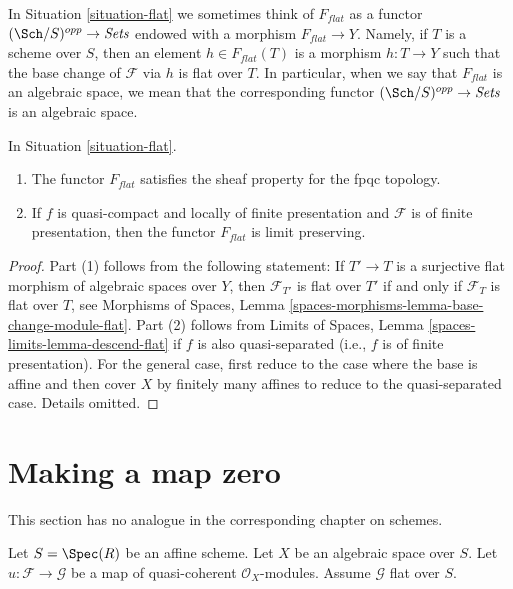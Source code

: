 \noindent
In Situation \ref{situation-flat} we sometimes think of $F_{flat}$ as a functor
$(\Sch/S)^{opp} \to \textit{Sets}$ endowed with a morphism
$F_{flat} \to Y$. Namely, if $T$ is a scheme over $S$, then
an element $h \in F_{flat}(T)$ is a morphism $h : T \to Y$
such that the base change of $\mathcal{F}$ via $h$ is flat over $T$.
In particular, when we say
that $F_{flat}$ is an algebraic space, we mean that the corresponding
functor $(\Sch/S)^{opp} \to \textit{Sets}$ is an algebraic space.

\begin{lemma}
\label{lemma-flat}
In Situation \ref{situation-flat}.
\begin{enumerate}
\item The functor $F_{flat}$ satisfies the sheaf property for the fpqc topology.
\item If $f$ is quasi-compact and locally of finite presentation
and $\mathcal{F}$ is of finite presentation, then the functor
$F_{flat}$ is limit preserving.
\end{enumerate}
\end{lemma}

\begin{proof}
Part (1) follows from the following statement: If $T' \to T$ is a surjective
flat morphism of algebraic spaces over $Y$, then
$\mathcal{F}_{T'}$ is flat over $T'$ if and only if
$\mathcal{F}_T$ is flat over $T$, see
Morphisms of Spaces, Lemma \ref{spaces-morphisms-lemma-base-change-module-flat}.
Part (2) follows from
Limits of Spaces, Lemma \ref{spaces-limits-lemma-descend-flat}
if $f$ is also quasi-separated (i.e., $f$ is of finite presentation).
For the general case, first reduce to the case where the
base is affine and then cover $X$ by finitely many affines
to reduce to the quasi-separated case. Details omitted.
\end{proof}










\section{Making a map zero}
\label{section-zero-map}

\noindent
This section has no analogue in the corresponding chapter on schemes.

\begin{situation}
\label{situation-somewhat-closed}
Let $S = \Spec(R)$ be an affine scheme. Let $X$ be an algebraic space over
$S$. Let $u : \mathcal{F} \to \mathcal{G}$ be a map of quasi-coherent
$\mathcal{O}_X$-modules. Assume $\mathcal{G}$ flat over $S$.
\end{situation}

